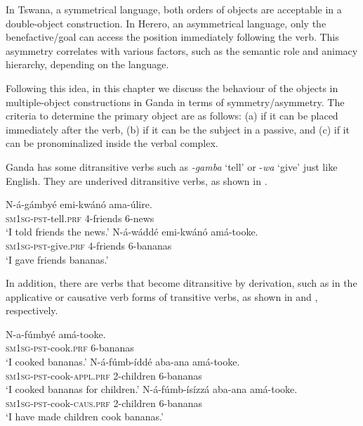 \documentclass[output=paper,
            colorlinks, citecolor=brown
            ,draftmode
		  ]{langscibook}
\begin{document}
In Tswana, a symmetrical language, both orders of objects are acceptable in a double-object construction. In Herero, an asymmetrical language, only the benefactive/goal can access the position immediately following the verb. This asymmetry correlates with various factors, such as the semantic role and animacy hierarchy, depending on the language.  


Following this idea, in this chapter we discuss the behaviour of the objects in multiple-object constructions in Ganda in terms of symmetry/asymmetry. The criteria to determine the primary object are as follows: (a) if it can be placed immediately after the verb, (b) if it can be the subject in a passive, and (c) if it can be pronominalized inside the verbal complex. 



Ganda has some ditransitive verbs such as \textit{{}-gamba} ‘tell’ or -\textit{wa} ‘give’ just like English. They are underived ditransitive verbs, as shown in . 



\ea%
    \label{ex:yoneda:7}
    \ea\label{ex:yoneda:7a}\gll N-á{}-gámbyé            emi-kwánó   ama-úlire.\\
        \textsc{sm1sg-pst}-tell.\textsc{prf}    4-friends      6-news  \\
    \glt ‘I told friends the news.’
    \ex\label{ex:yoneda:7b} \gll N-á-wáddé             emi-kwánó   amá-tooke.\\
    \textsc{sm1sg-pst}-give.\textsc{prf}  4-friends      6-bananas\\
    \glt ‘I gave friends bananas.’
    \z
\z

In addition, there are verbs that become ditransitive by derivation, such as in the applicative or causative verb forms of transitive verbs, as shown in  and , respectively. 


\ea%
    \label{ex:yoneda:8}
    \ea\label{ex:yoneda:8a}\gll  N-a-fúmbyé               amá-tooke.\\
         \textsc{sm1sg-pst}-cook.\textsc{prf}    6-bananas\\
    \glt ‘I cooked bananas.’
    \ex\label{ex:yoneda:8b}\gll N-á{}-fúmb-íddé                 aba-ana     amá-tooke.\\
    \textsc{sm1sg-pst}-cook-\textsc{appl.prf}    2-children  6-bananas\\
    \glt ‘I cooked bananas for children.’
    \ex\label{ex:yoneda:8c}\gll N-á{}-fúmb-ísízzá                 aba-ana       amá-tooke.\\
    \textsc{sm1sg-pst}-cook-\textsc{caus.prf}    2-children    6-bananas\\
    \glt ‘I have made children cook bananas.’
    \z
\z
\end{document}

